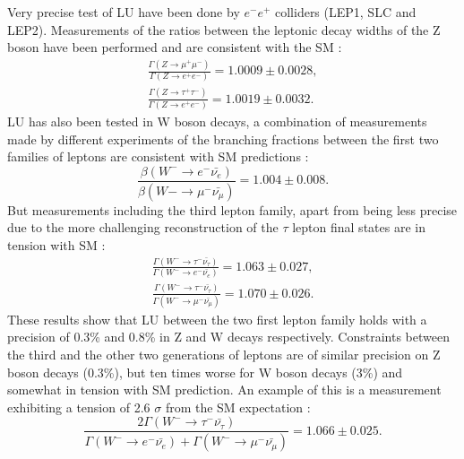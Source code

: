 Very precise test of LU have been done by $e^-e^+$ colliders (LEP1, SLC and LEP2). Measurements of the ratios between the leptonic decay widths of the Z boson have been performed and are consistent with the SM \cite{ALEPH:2005ab}:
\begin{align}
	\frac{\Gamma(Z\to\mu^+\mu^-)}{\Gamma(Z\to e^+e^-)}=1.0009\pm 0.0028,
	\\
	\frac{\Gamma(Z\to\tau^+\tau^-)}{\Gamma(Z\to e^+e^-)}=1.0019\pm 0.0032.
\end{align}
LU has also been tested in W boson decays, a combination of measurements made by different experiments of the branching fractions between the first two families of leptons are consistent with SM predictions \cite{Pich:2013lsa}:
\begin{equation}
\frac{\beta(W^-\to e^-\bar{\nu_e})}{\beta(W-\to \mu^-\bar{\nu_\mu})}=1.004\pm 0.008.
\end{equation}
But measurements including the third lepton family, apart from being less precise due to the more challenging reconstruction of the $\tau$ lepton final states are in tension with SM \cite{Schael:2013ita}:
\begin{align}
\frac{\Gamma(W^-\to\tau^-\bar{\nu_\tau})}{\Gamma(W^-\to e^-\bar{\nu_e})}=1.063\pm 0.027,
\\
\frac{\Gamma(W^-\to\tau^-\bar{\nu_\tau})}{\Gamma(W^-\to \mu^-\bar{\nu_\mu})}=1.070\pm 0.026.
\end{align}
These results show that LU between the two first lepton family holds with a precision of 0.3\% and 0.8\% in Z and W decays respectively. Constraints between the third and the other two generations of leptons are of similar precision on Z boson decays (0.3\%), but ten times worse for W boson decays (3\%) and somewhat in tension with SM prediction. An example of this is a measurement exhibiting a tension of 2.6 $\sigma$ from the SM expectation \cite{Schael:2013ita}:
\begin{equation}
	\frac{2\Gamma(W^-\to\tau^-\bar{\nu_\tau})}{\Gamma(W^-\to e^-\bar{\nu_e})+\Gamma(W^-\to \mu^-\bar{\nu_\mu})}=1.066\pm 0.025.
\end{equation}  


